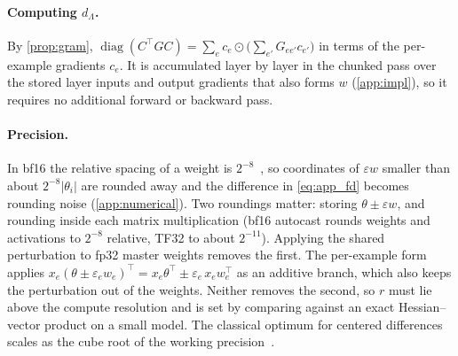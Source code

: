 \documentclass[11pt]{article}
\begin{document}
\paragraph{Computing $d_\Lambda$.}
By \cref{prop:gram}, $\operatorname{diag}(C^\top GC)=\sum_ec_e\odot\bigl(\sum_{e'}G_{ee'}c_{e'}\bigr)$ in terms of the per-example gradients $c_e$. It is accumulated layer by layer in the chunked pass over the stored layer inputs and output gradients that also forms $w$ (\cref{app:impl}), so it requires no additional forward or backward pass.

\paragraph{Precision.}
In bf16 the relative spacing of a weight is $2^{-8}$~\citep{kalamkar2019study}, so coordinates of $\varepsilon w$ smaller than about $2^{-8}|\theta_i|$ are rounded away and the difference in \cref{eq:app_fd} becomes rounding noise (\cref{app:numerical}). Two roundings matter: storing $\theta\pm\varepsilon w$, and rounding inside each matrix multiplication (bf16 autocast rounds weights and activations to $2^{-8}$ relative, TF32 to about $2^{-11}$). Applying the shared perturbation to fp32 master weights removes the first. The per-example form applies $x_e(\theta\pm\varepsilon_ew_e)^\top=x_e\theta^\top\pm\varepsilon_e\,x_ew_e^\top$ as an additive branch, which also keeps the perturbation out of the weights. Neither removes the second, so $r$ must lie above the compute resolution and is set by comparing against an exact Hessian--vector product on a small model. The classical optimum for centered differences scales as the cube root of the working precision~\citep{nocedal2006numerical}.
\end{document}
